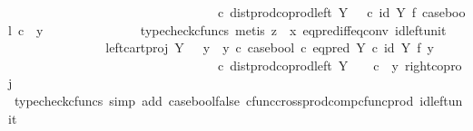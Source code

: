 \begin{isabellebody}
\ \ \ \ \ \ \ \ \ \ \ \ \ \ \ \ \ \ \ \ \ \ \ \ \ \ \ \ \ \ \ \ \ {\isasymcirc}\isactrlsub c\ dist{\isacharunderscore}{\kern0pt}prod{\isacharunderscore}{\kern0pt}coprod{\isacharunderscore}{\kern0pt}left\ Y\ {\isasymone}\ {\isasymone}\ {\isasymcirc}\isactrlsub c\ {\isacharparenleft}{\kern0pt}id\ Y\ {\isasymtimes}\isactrlsub f\ case{\isacharunderscore}{\kern0pt}bool{\isacharparenright}{\kern0pt}\ {\isasymcirc}\isactrlsub c\ \ {\isasymlangle}y{}{\isacharcomma}{\kern0pt}\ {\isasymf}{\isasymrangle}{\isachardoublequoteclose}\isanewline
\ \ \ \ \ \ \ \ \ \ \ \ \isamarkupfalse%
\ {\isacharparenleft}{\kern0pt}typecheck{\isacharunderscore}{\kern0pt}cfuncs{\isacharcomma}{\kern0pt}\ metis\ {\isacartoucheopen}z\ {\isasymnoteq}\ x{\isacartoucheclose}\ eq{\isacharunderscore}{\kern0pt}pred{\isacharunderscore}{\kern0pt}iff{\isacharunderscore}{\kern0pt}eq{\isacharunderscore}{\kern0pt}conv\ id{\isacharunderscore}{\kern0pt}left{\isacharunderscore}{\kern0pt}unit{}{\isacharparenright}{\kern0pt}\isanewline
\ \ \ \ \ \ \ \ \ \ \isamarkupfalse%
\ \isamarkupfalse%
\ {\isachardoublequoteopen}{\isachardot}{\kern0pt}{\isachardot}{\kern0pt}{\isachardot}{\kern0pt}\ {\isacharequal}{\kern0pt}\ {\isacharparenleft}{\kern0pt}left{\isacharunderscore}{\kern0pt}cart{\isacharunderscore}{\kern0pt}proj\ Y\ {\isasymone}\ {\isasymamalg}\ {\isacharparenleft}{\kern0pt}{\isacharparenleft}{\kern0pt}y{}\ {\isasymamalg}\ y{}{\isacharparenright}{\kern0pt}\ {\isasymcirc}\isactrlsub c\ case{\isacharunderscore}{\kern0pt}bool\ {\isasymcirc}\isactrlsub c\ eq{\isacharunderscore}{\kern0pt}pred\ Y\ {\isasymcirc}\isactrlsub c\ {\isacharparenleft}{\kern0pt}id\ Y\ {\isasymtimes}\isactrlsub f\ y{}{\isacharparenright}{\kern0pt}{\isacharparenright}{\kern0pt}{\isacharparenright}{\kern0pt}\ \isanewline
\ \ \ \ \ \ \ \ \ \ \ \ \ \ \ \ \ \ \ \ \ \ \ \ \ \ \ \ \ \ \ \ \ {\isasymcirc}\isactrlsub c\ dist{\isacharunderscore}{\kern0pt}prod{\isacharunderscore}{\kern0pt}coprod{\isacharunderscore}{\kern0pt}left\ Y\ {\isasymone}\ {\isasymone}\ \ {\isasymcirc}\isactrlsub c\ \ {\isasymlangle}y{}{\isacharcomma}{\kern0pt}\ right{\isacharunderscore}{\kern0pt}coproj\ {\isasymone}\ {\isasymone}{\isasymrangle}{\isachardoublequoteclose}\isanewline
\ \ \ \ \ \ \ \ \ \ \ \ \isamarkupfalse%
\ {\isacharparenleft}{\kern0pt}typecheck{\isacharunderscore}{\kern0pt}cfuncs{\isacharcomma}{\kern0pt}\ simp\ add{\isacharcolon}{\kern0pt}\ case{\isacharunderscore}{\kern0pt}bool{\isacharunderscore}{\kern0pt}false\ cfunc{\isacharunderscore}{\kern0pt}cross{\isacharunderscore}{\kern0pt}prod{\isacharunderscore}{\kern0pt}comp{\isacharunderscore}{\kern0pt}cfunc{\isacharunderscore}{\kern0pt}prod\ id{\isacharunderscore}{\kern0pt}left{\isacharunderscore}{\kern0pt}unit{}{\isacharparenright}{\kern0pt}\isanewline

\end{isabellebody}
